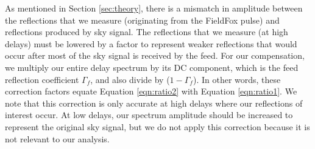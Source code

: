 \documentclass[iop]{emulateapj}
\begin{document}
As mentioned in Section \ref{sec:theory}, there is a mismatch in amplitude
between the reflections that we measure (originating from the FieldFox pulse)
and reflections produced by sky signal. The reflections that we measure (at high
delays) must be lowered by a factor to represent weaker reflections that would
occur after most of the sky signal is received by the feed. For our
compensation, we multiply our entire delay spectrum by its DC component, which is the feed reflection coefficient $\Gamma_{f}$, and also divide by ($1-\Gamma_{f}$). In other words, these correction factors equate Equation \ref{eqn:ratio2} with Equation \ref{eqn:ratio1}. 
We note that this correction is only accurate at high delays where our
reflections of interest occur. At low delays, our spectrum amplitude should be
increased to represent the original sky signal, but we do not apply this
correction because it is not relevant to our analysis.
\end{document}
